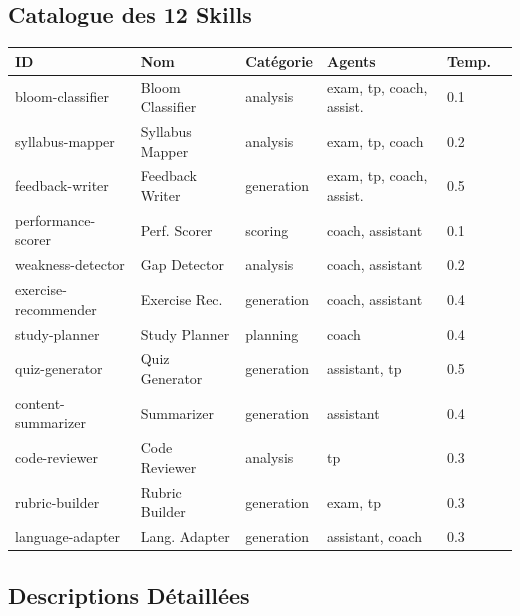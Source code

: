 \documentclass[12pt,a4paper]{article}
\begin{document}
\subsection{Catalogue des 12 Skills}

\begin{longtable}{llllll}
\toprule
\textbf{ID} & \textbf{Nom} & \textbf{Catégorie} & \textbf{Agents} & \textbf{Temp.} \\
\midrule
bloom-classifier & Bloom Classifier & analysis & exam, tp, coach, assist. & 0.1 \\
syllabus-mapper & Syllabus Mapper & analysis & exam, tp, coach & 0.2 \\
feedback-writer & Feedback Writer & generation & exam, tp, coach, assist. & 0.5 \\
performance-scorer & Perf. Scorer & scoring & coach, assistant & 0.1 \\
weakness-detector & Gap Detector & analysis & coach, assistant & 0.2 \\
exercise-recommender & Exercise Rec. & generation & coach, assistant & 0.4 \\
study-planner & Study Planner & planning & coach & 0.4 \\
quiz-generator & Quiz Generator & generation & assistant, tp & 0.5 \\
content-summarizer & Summarizer & generation & assistant & 0.4 \\
code-reviewer & Code Reviewer & analysis & tp & 0.3 \\
rubric-builder & Rubric Builder & generation & exam, tp & 0.3 \\
language-adapter & Lang. Adapter & generation & assistant, coach & 0.3 \\
\bottomrule
\end{longtable}

\subsection{Descriptions Détaillées}
\end{document}
